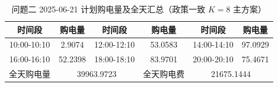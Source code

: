 \begin{table}[htbp]
\centering
\caption{问题二 2025-06-21 计划购电量及全天汇总（政策一致 $K=8$ 主方案）}\label{tab:q2-purchase}
\normalsize\setlength{\tabcolsep}{5pt}
\begin{tabular}{@{}cccccc@{}}
\toprule
时间段 & 购电量 & 时间段 & 购电量 & 时间段 & 购电量 \\
\midrule
10:00-10:10 & 2.9074 & 12:00-12:10 & 53.0583 & 14:00-14:10 & 97.0929 \\
16:00-16:10 & 52.2398 & 18:00-18:10 & 83.9701 & 20:00-20:10 & 75.4671 \\
全天购电量 & \multicolumn{2}{c}{39963.9723} & 全天购电费 & \multicolumn{2}{c}{21675.1444} \\
\bottomrule
\end{tabular}
\end{table}
